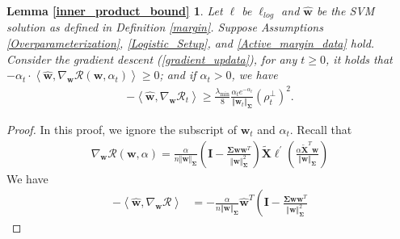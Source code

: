 \documentclass[pdflatex,sn-basic]{sn-jnl}%
\theoremstyle{thmstyleone}%
\begin{document}
\begin{appendices}
\newtheorem*{restate_inner_product_bound}{Lemma \ref{inner_product_bound}}
\begin{shaded}
\begin{restate_inner_product_bound}
  Let $\ell$ be $\ell_{log}$ and $\hat{\mathbf{w}}$ be the SVM solution as defined in Definition \ref{margin}. 
  Suppose Assumptions \ref{Overparameterization}, \ref{Logistic_Setup}, and \ref{Active_margin_data} hold.
  Consider the gradient descent (\ref{gradient_updata}), for any $t \ge 0$, it holds that
  $- \alpha_t \cdot \left\langle \hat{\mathbf{w}}, \nabla_{\mathbf{w}} \mathcal{R} \left(\mathbf{w}, \alpha_t\right) \right\rangle \ge 0$; 
  and if $\alpha_t > 0$, we have 
  \begin{equation*}
  \begin{aligned}
    - \left\langle \hat{\mathbf{w}}, \nabla_{\mathbf{w}} \mathcal{R}_t \right\rangle 
    \ge 
    \frac{\lambda_{\min}}{8}
    \frac{\alpha_t  e^{-\alpha_t }}{\Vert \mathbf{w}_t  \Vert_{\mathbf{\Sigma}}}
    \left( \rho_t^{\perp} \right)^2.
  \end{aligned}
  \end{equation*}
\end{restate_inner_product_bound}
\end{shaded}
\begin{proof}
  In this proof, we ignore the subscript of $\mathbf{w}_t$ and $\alpha_t$.  
  Recall that 
  \begin{equation*}
  \begin{aligned}
    \nabla_{\mathbf{w}} \mathcal{R}
    \left(\mathbf{w}, \alpha\right)
     = \frac{\alpha}{n \Vert \mathbf{w} \Vert_{\mathbf{\Sigma}}}
      \left(
        \mathbf{I} - \frac{\mathbf{\Sigma} \mathbf{w} \mathbf{w}^{T}}{\Vert \mathbf{w} \Vert_{\mathbf{\Sigma}}^{2}}
      \right)
      \tilde{\mathbf{X}} 
      \boldsymbol{\ell^\prime}\left(
        \frac{
        \alpha \tilde{\mathbf{X}}^T \mathbf{w}
        }{\Vert \mathbf{w} \Vert_\mathbf{\Sigma}}
      \right)
  \end{aligned}
  \end{equation*}
  We have 
  \begin{equation*}
  \begin{aligned}
    - \left\langle \hat{\mathbf{w}}, \nabla_{\mathbf{w}} \mathcal{R} \right\rangle 
    & = 
    - \frac{\alpha}{n \Vert \mathbf{w} \Vert_{\mathbf{\Sigma}}}
    \hat{\mathbf{w}}^T
    \left(
      \mathbf{I} - \frac{\mathbf{\Sigma} \mathbf{w} \mathbf{w}^{T}}{\Vert \mathbf{w} \Vert_{\mathbf{\Sigma}}^{2}}

\end{aligned}
\end{equation*}
\end{proof}
\end{appendices}
\end{document}
